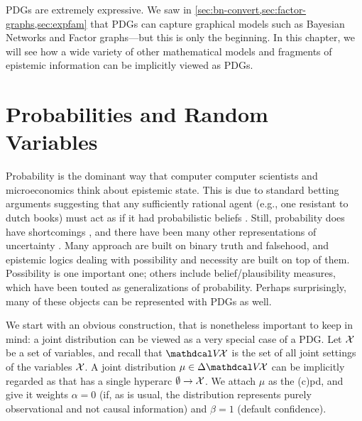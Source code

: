 PDGs are extremely expressive.
We saw in \cref{sec:bn-convert,sec:factor-graphs,sec:expfam} that PDGs
can capture graphical models such as Bayesian Networks and Factor graphs---but this is only the beginning. 
%
In this chapter, we will see how a wide variety of other mathematical models and fragments of epistemic information can be implicitly viewed as PDGs.


\section{Probabilities and Random Variables}
    \label{sec:prob-as-pdg}

Probability is the dominant way that computer computer scientists and
microeconomics think about epistemic state.
This is due to standard betting arguments suggesting that any sufficiently rational agent (e.g., one resistant to dutch books)
must act as if it had probabilistic beliefs \cite{..,savage}.
Still, probability does have shortcomings \cite{}, and there have been many other representations of uncertainty \cite{halpern2017reasoning}.
Many approach are built on binary truth and falsehood, and epistemic logics dealing with possibility and necessity are built on top of them.
Possibility is one important one; others include belief/plausibility measures, which have been touted as generalizations of probability. 
Perhaps surprisingly, many of these objects can be represented with PDGs as well.

We start with an obvious construction, that is nonetheless important
to keep in mind: a joint distribution can be viewed as a very special case of a PDG. 
Let $\mathcal X$ be a set of variables, and recall that $\V\!\X$ is the set of all joint settings of the variables $\mathcal X$. 
A joint distribution $\mu \in \Delta \V\!\X$ can be implicitly regarded as that has a single hyperarc $\emptyset \to \mathcal X$. We attach $\mu$ as the (c)pd, and give it weights $\alpha=0$ (if, as is usual, the distribution represents purely observational and not causal information) and $\beta = 1$ (default confidence). 

